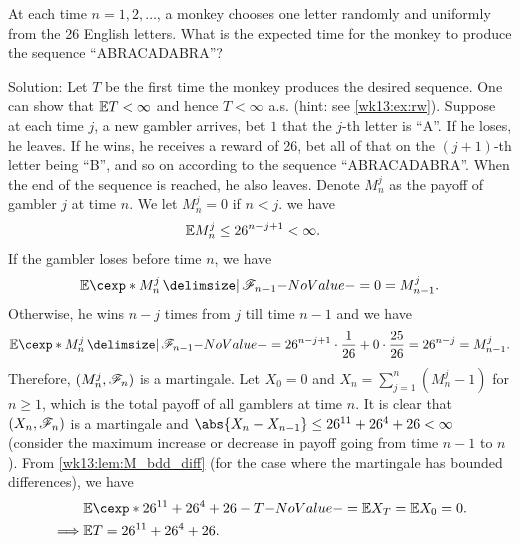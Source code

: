 \documentclass[12pt]{article}
\begin{document}
\begin{Example}
At each time $n = 1, 2, \ldots$, a monkey chooses one letter randomly and uniformly from the 26 English letters. What is the expected time for the monkey to produce the sequence ``ABRACADABRA''?

Solution: Let $T$ be the first time the monkey produces the desired sequence. One can show that $\E T < \infty$ and hence $T < \infty$ a.s. (hint: see \cref{wk13:ex:rw}). Suppose at each time $j$, a new gambler arrives, bet $1$ that the $j$-th letter is ``A''. If he loses, he leaves. If he wins, he receives a reward of 26, bet all of that on the $(j+1)$-th letter being ``B'', and so on according to the sequence ``ABRACADABRA''. When the end of the sequence is reached, he also leaves. Denote $M_n^j$ as the payoff of gambler $j$ at time $n$. We let $M_n^j =0 $ if $n < j$. we have
\begin{align*}
\E M_n^j \leq 26^{n-j+1} &< \infty.  
\end{align*}
If the gambler loses before time $n$, we have
\begin{align*}
\E[M_n^j \given \scF_{n-1}] = 0 = M_{n-1}^j.
\end{align*}
Otherwise, he wins $n - j$ times from $j$ till time $n-1$ and we have
\begin{align*}
\E[M_n^j \given \scF_{n-1}] = 26^{n-j+1}\cdot\frac{1}{26} + 0\cdot \frac{25}{26} = 26^{n-j} = M_{n-1}^j.
\end{align*}
Therefore, $(M_n^j, \mathscr{F}_n)$ is a martingale. Let $X_0=0$ and $X_n = \sum_{j=1}^n (M_n^j-1)$ for $n\geq1$, which is the total payoff of all gamblers at time $n$. It is clear that $(X_n, \mathscr{F}_n)$ is a martingale and $\abs{X_n - X_{n-1}} \leq  26^{11} + 26^{4} + 26 < \infty$ (consider the maximum increase or decrease in payoff going from time $n-1$ to $n$). From \cref{wk13:lem:M_bdd_diff} (for the case where the martingale has bounded differences), we have 
\begin{align*}
&\E[26^{11} + 26^{4} + 26 - T] = \E X_T = \E X_0 = 0. \\
\implies
&\E T = 26^{11} + 26^{4} + 26.
\end{align*}
\end{Example}

%

\end{document}
